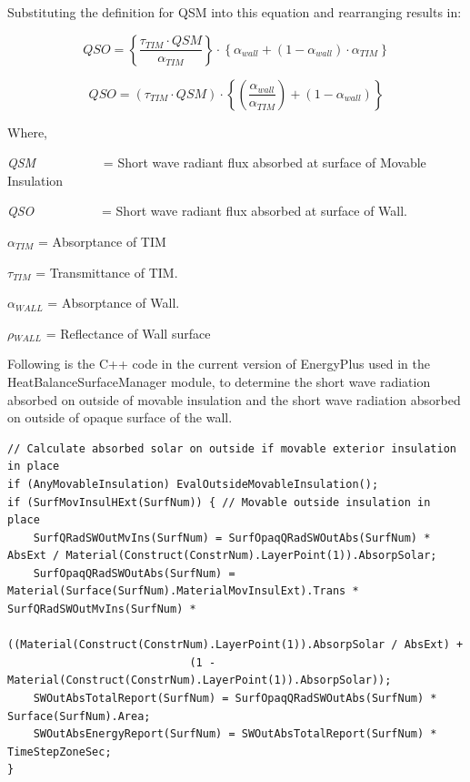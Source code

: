 Substituting the definition for QSM into this equation and rearranging results in:

\begin{equation}
QSO = \left\{ {\frac{{{\tau_{TIM}}\cdot QSM}}{{{\alpha_{TIM}}}}} \right\}\cdot \left\{ {{\alpha_{wall}} + \left( {1 - {\alpha_{wall}}} \right)\cdot {\alpha_{TIM}}} \right\}
\end{equation}

\begin{equation}
QSO = \left( {{\tau_{TIM}}\cdot QSM} \right)\cdot \left\{ {\left( {\frac{{{\alpha_{wall}}}}{{{\alpha_{TIM}}}}} \right) + \left( {1 - {\alpha_{wall}}} \right)} \right\}
\end{equation}

Where,

\emph{QSM}~~~~~~~~~~ = Short wave radiant flux absorbed at surface of Movable Insulation

\emph{QSO}~~~~~~~~~~ = Short wave radiant flux absorbed at surface of Wall.

$\alpha$\(_{TIM}\) = Absorptance of TIM

$\tau$\(_{TIM}\) = Transmittance of TIM.

$\alpha$\(_{WALL}\) = Absorptance of Wall.

$\rho$\(_{WALL}\) = Reflectance of Wall surface

Following is the C++ code in the current version of EnergyPlus used in the HeatBalanceSurfaceManager module, to determine the short wave radiation absorbed on outside of movable insulation and the short wave radiation absorbed on outside of opaque surface of the wall.

\begin{lstlisting}
// Calculate absorbed solar on outside if movable exterior insulation in place
if (AnyMovableInsulation) EvalOutsideMovableInsulation();
if (SurfMovInsulHExt(SurfNum)) { // Movable outside insulation in place
    SurfQRadSWOutMvIns(SurfNum) = SurfOpaqQRadSWOutAbs(SurfNum) * AbsExt / Material(Construct(ConstrNum).LayerPoint(1)).AbsorpSolar;
    SurfOpaqQRadSWOutAbs(SurfNum) = Material(Surface(SurfNum).MaterialMovInsulExt).Trans * SurfQRadSWOutMvIns(SurfNum) *
                            ((Material(Construct(ConstrNum).LayerPoint(1)).AbsorpSolar / AbsExt) +
                            (1 - Material(Construct(ConstrNum).LayerPoint(1)).AbsorpSolar));
    SWOutAbsTotalReport(SurfNum) = SurfOpaqQRadSWOutAbs(SurfNum) * Surface(SurfNum).Area;
    SWOutAbsEnergyReport(SurfNum) = SWOutAbsTotalReport(SurfNum) * TimeStepZoneSec;
}
\end{lstlisting}

